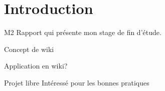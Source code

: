 \section*{Introduction}

M2
Rapport qui présente mon stage de fin d'étude.

Concept de wiki

Application en wiki?

Projet libre 
Intéressé pour les bonnes pratiques

